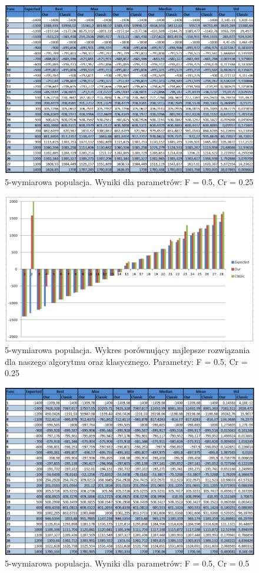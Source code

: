 \documentclass[a4paper]{article}
\begin{document}
\begin{figure}
\centering
\includegraphics[width=\textwidth]{F5Cr25L5tab.png}
\caption{5-wymiarowa populacja. Wyniki dla parametrów: F = 0.5, Cr = 0.25}
\end{figure}

\begin{figure}
\centering
\includegraphics[width=\textwidth]{F5Cr25L5chart.png}
\caption{5-wymiarowa populacja. Wykres porównujący najlepsze rozwiązania dla naszego algorytmu oraz klasycznego. Parametry: F = 0.5, Cr = 0.25}
\end{figure}

\begin{figure}
\centering
\includegraphics[width=\textwidth]{F5Cr5L5tab.png}
\caption{5-wymiarowa populacja. Wyniki dla parametrów: F = 0.5, Cr = 0.5}
\end{figure}
\end{document}
